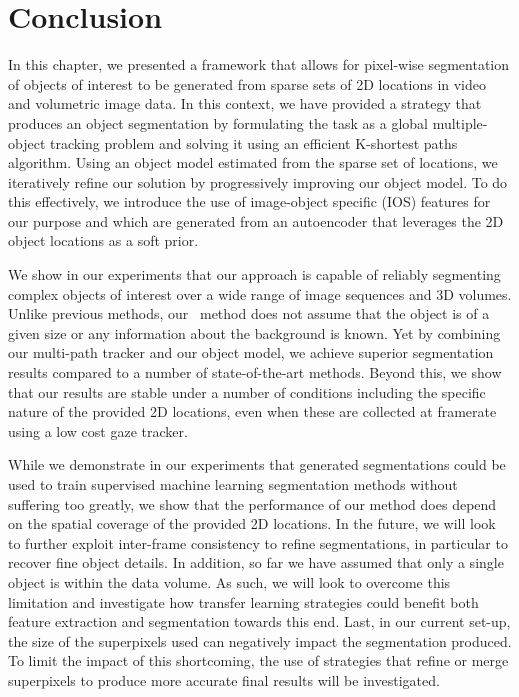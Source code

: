 \section{Conclusion}
\label{sec:conclusion}
In this chapter, we presented a framework that allows for pixel-wise segmentation of objects of interest to be generated from sparse sets of 2D locations in video and volumetric image data. In this context, we have provided a strategy that produces an object segmentation by formulating the task as a global multiple-object tracking problem and solving it using an efficient K-shortest paths algorithm. Using an object model estimated from the sparse set of locations, we iteratively refine our solution by progressively improving our object model. To do this effectively, we introduce the use of image-object specific (IOS) features for our purpose and which are generated from an autoencoder that leverages the 2D object locations as a soft prior.

We show in our experiments that our approach is capable of reliably segmenting complex objects of interest over a wide range of image sequences and 3D volumes. Unlike previous methods, our \KSP ~method does not assume that the object is of a given size or any information about the background is known. Yet by combining our multi-path tracker and our object model, we achieve superior segmentation results compared to a number of state-of-the-art methods. Beyond this, we show that our results are stable under a number of conditions including the specific nature of the provided 2D locations, even when these are collected at framerate using a low cost gaze tracker.

While we demonstrate in our experiments that generated segmentations could be used to train supervised machine learning segmentation methods without suffering too greatly, we show that the performance of our method does depend on the spatial coverage of the provided 2D locations. In the future, we will look to further exploit inter-frame consistency to refine segmentations, in particular to recover fine object details. In addition, so far we have assumed that only a single object is within the data volume. As such, we will look to overcome this limitation and investigate how transfer learning strategies could benefit both feature extraction and segmentation towards this end. Last, in our current set-up, the size of the superpixels used can negatively impact the segmentation produced. To limit the impact of this shortcoming, the use of strategies that refine or merge superpixels to produce more accurate final results will be investigated.


